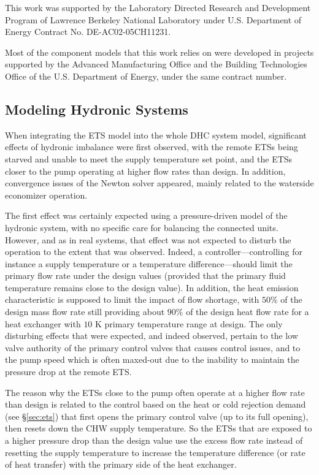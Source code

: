 This work was supported by the Laboratory Directed Research and Development Program of Lawrence Berkeley National Laboratory under U.S. Department of Energy Contract No. DE-AC02-05CH11231.

Most of the component models that this work relies on were developed in projects supported by the Advanced Manufacturing Office and the Building Technologies Office of the U.S. Department of Energy, under the same contract number.


\pagebreak
\begin{appendix}

    \section{Modeling Hydronic Systems} \label{sec:balancing}

When integrating the ETS model into the whole DHC system model, significant effects of hydronic imbalance were first observed, with the remote ETSs being starved and unable to meet the supply temperature set point, and the ETSs closer to the pump operating at higher flow rates than design.
In addition, convergence issues of the Newton solver appeared, mainly related to the waterside economizer operation.

The first effect was certainly expected using a pressure-driven model of the hydronic system, with no specific care for balancing the connected units. However, and as in real systems, that effect was not expected to disturb the operation to the extent that was observed. Indeed, a controller---controlling for instance a supply temperature or a temperature difference---should limit the primary flow rate under the design values (provided that the primary fluid temperature remains close to the design value). In addition, the heat emission characteristic is supposed to limit the impact of flow shortage, with $50\%$ of the design mass flow rate still providing about $90\%$ of the design heat flow rate for a heat exchanger with $10$ K primary temperature range at design. The only disturbing effects that were expected, and indeed observed, pertain to the low valve authority of the primary control valves that causes control issues, and to the pump speed which is often maxed-out due to the inability to maintain the pressure drop at the remote ETS.

The reason why the ETSs close to the pump often operate at a higher flow rate than design is related to the control based on the heat or cold rejection demand (see §\ref{sec:ets}) that first opens the primary control valve (up to its full opening), then resets down the CHW supply temperature. So the ETSs that are exposed to a higher pressure drop than the design value use the excess flow rate instead of resetting the supply temperature to increase the temperature difference (or rate of heat transfer) with the primary side of the heat exchanger.


\end{appendix}
